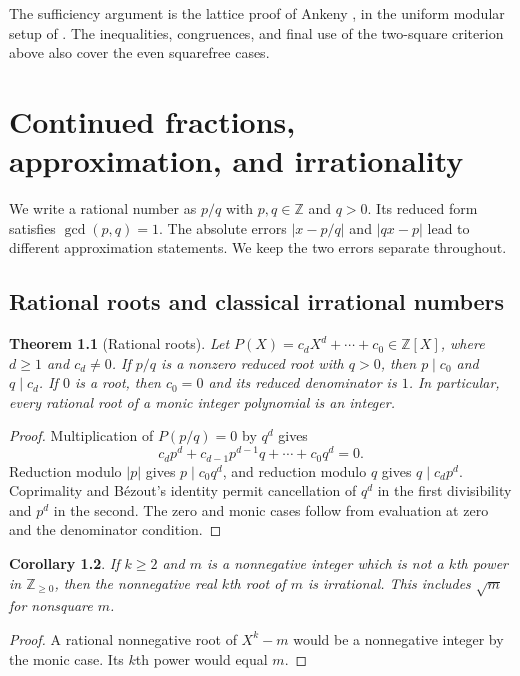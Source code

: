 \documentclass[11pt,oneside,openany]{book}
\theoremstyle{plain}
\newtheorem{theorem}{Theorem}[chapter]
\newtheorem{corollary}[theorem]{Corollary}
\theoremstyle{definition}
\theoremstyle{remark}
\begin{document}
The sufficiency argument is the lattice proof of Ankeny
\cite{ankeny}, in the uniform modular setup of \cite[Section 5]{fan}.
The inequalities, congruences, and final use of the two-square
criterion above also cover the even squarefree cases.
\chapter[Continued fractions and approximation]{Continued fractions, approximation, and irrationality}
\label{ch:nt-cf}

We write a rational number as \(p/q\) with \(p,q\in\mathbb Z\) and
\(q>0\). Its reduced form satisfies \(\gcd(p,q)=1\). The absolute errors
\(\lvert x-p/q\rvert\) and \(\lvert qx-p\rvert\) lead to different
approximation statements. We keep the two errors separate throughout.

\section{Rational roots and classical irrational numbers}
\label{nt:E01}

\begin{theorem}[Rational roots]
Let \(P(X)=c_dX^d+\cdots+c_0\in\mathbb Z[X]\), where \(d\ge1\) and
\(c_d\ne0\). If \(p/q\) is a nonzero reduced root with \(q>0\), then
\(p\mid c_0\) and \(q\mid c_d\). If \(0\) is a root, then \(c_0=0\) and
its reduced denominator is \(1\). In particular, every rational root of
a monic integer polynomial is an integer.
\end{theorem}
\begin{proof}
Multiplication of \(P(p/q)=0\) by \(q^d\) gives
\[
 c_dp^d+c_{d-1}p^{d-1}q+\cdots+c_0q^d=0.
\]
Reduction modulo \(\lvert p\rvert\) gives \(p\mid c_0q^d\), and reduction
modulo \(q\) gives \(q\mid c_dp^d\). Coprimality and Bézout's identity
permit cancellation of \(q^d\) in the first divisibility and \(p^d\) in
the second. The zero and monic cases follow from evaluation at zero
and the denominator condition.
\end{proof}

\begin{corollary}
If \(k\ge2\) and \(m\) is a nonnegative integer which is not a \(k\)th
power in \(\mathbb Z_{\ge0}\), then the nonnegative real \(k\)th root of
\(m\) is irrational. This includes \(\sqrt m\) for nonsquare \(m\).
\end{corollary}
\begin{proof}
A rational nonnegative root of \(X^k-m\) would be a nonnegative integer
by the monic case. Its \(k\)th power would equal \(m\).
\end{proof}
\end{document}
